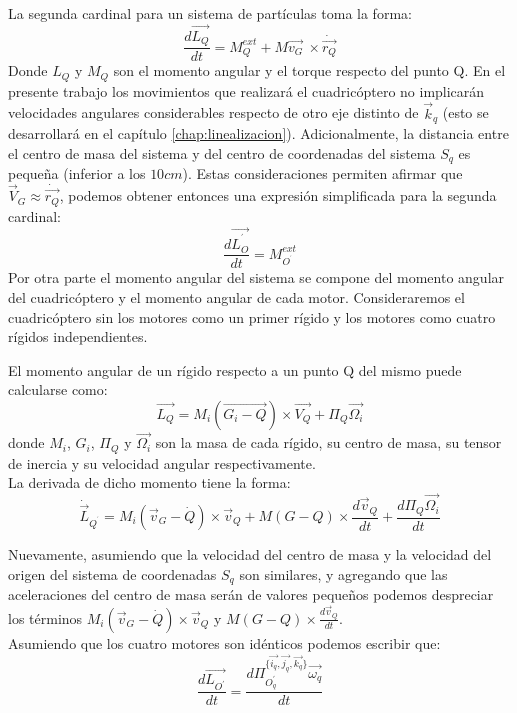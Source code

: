 \documentclass[main]{subfiles}
\begin{document}
La segunda cardinal para un sistema de part\'iculas toma la forma:
\begin{equation}
\frac{d\vec{L_Q}}{dt} =M_Q^{ext}+M\vec{v_G}\ \times \dot{\vec{r_Q}} 
\end{equation}
Donde $L_Q$ y $M_Q$ son el momento angular y el torque respecto del punto Q. En el presente trabajo los movimientos que realizar\'a el cuadric\'optero no implicar\'an velocidades angulares considerables respecto de otro eje distinto de $\vec{k}_q$ (esto se desarrollar\'a en el cap\'itulo \ref{chap:linealizacion}). Adicionalmente, la distancia entre el centro de masa del sistema y del centro de coordenadas del sistema $S_q$ es pequeña (inferior a los $10cm$). Estas consideraciones permiten afirmar que $\vec{V}_G \approx \dot{\vec{r_Q}}$, podemos obtener entonces una expresi\'on simplificada para la segunda cardinal:
\begin{equation}
\frac{d\vec{L_O^{^\prime}}}{dt} =M_{O^{^\prime}}^{ext}
\end{equation}
Por otra parte el momento angular del sistema se compone del momento angular del cuadric\'optero y el momento angular de cada motor. Consideraremos el cuadric\'optero sin los motores como un primer r\'igido y los motores como cuatro r\'igidos independientes.

El momento angular de un r\'igido respecto a un punto Q del mismo puede calcularse como:
\begin{equation}
\vec{L_Q} = M_i(\vec{G_i-Q})\times\vec{V_Q}+\Pi_{Q}\vec{\Omega_i}
\end{equation}
donde $M_i$, $G_i$, $\Pi_{Q}$ y $\vec{\Omega_i}$ son la masa de cada r\'igido, su centro de masa, su tensor de inercia y su velocidad angular respectivamente.\\

La derivada de dicho momento tiene la forma:
\begin{equation}
\dot{\vec{L}}_{Q^{^\prime}} = M_i(\vec{v}_G-\dot{Q})\times\vec{v}_Q+M(G-Q) \times \frac{d\vec{v}_Q}{dt}+\frac{d\Pi_{Q}\vec{\Omega_i}}{dt}
\end{equation}

Nuevamente, asumiendo que la velocidad del centro de masa y la velocidad del origen del sistema de coordenadas $S_q$ son similares, y agregando que las aceleraciones del centro de masa ser\'an de valores pequeños podemos despreciar los t\'erminos $ M_i(\vec{v}_G-\dot{Q})\times \vec{v}_Q$ y $M(G-Q) \times \frac{d\vec{v}_Q}{dt}$. \\
Asumiendo que los cuatro motores son id\'enticos podemos escribir que:
\begin{equation}
\label{eq:dmomento}
\frac{d\vec{L_{O^\prime}}}{dt} = \frac{d\Pi_{O^\prime_q}^{\{\vec{i_q}, \vec{j_q}, \vec{k_q}\}}\vec{\omega_q}}{dt}
\end{equation}
\end{document}
